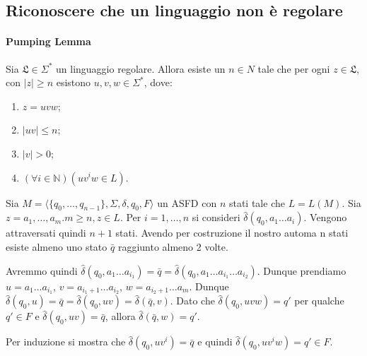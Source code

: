 \documentclass[a4paper, 10pt]{report}
\begin{document}
\subsection*{Riconoscere che un linguaggio non è regolare}

\paragraph*{Pumping Lemma} Sia $\mathfrak{L} \in \Sigma^*$ un linguaggio regolare. Allora esiste un $n\in N$ tale che per ogni $z\in \mathfrak{L}$, con $|z|\geq n$ esistono $u,v,w\in\Sigma^*$, dove:
	\begin{enumerate}
		\item $z = uvw$;
		\item $|uv|\leq n$;
		\item $|v|>0$;
		\item $(\forall i\in\mathbb{N}) (uv^iw\in L)$.
	\end{enumerate}

\begin{tcolorbox}
Sia $M=\langle\{q_0,\dotsc,q_{n-1}\},\Sigma,\delta,q_0,F\rangle$ un ASFD con $n$ stati tale che $L=L(M)$. Sia $z=a_1,\dotsc,a_m.m\geq n, z\in L$. Per $i=1,\dots,n$ si consideri $\hat\delta(q_0, a_1\dotsc a_i)$. Vengono attraversati quindi $n+1$ stati. Avendo per costruzione il nostro automa n stati esiste almeno uno stato $\bar q$ raggiunto almeno 2 volte. 
	
	Avremmo quindi $\hat\delta(q_0, a_1\dots a_{i_1}) = \bar q = \hat\delta(q_0, a_1\dots a_{i_1} \dots a_{i_2})$. Dunque prendiamo $u=a_1\dots a_{i_1}$, $v=a_{i_1+1}\dots a_{i_2}$, $w=a_{i_2+1}\dots a_m$. Dunque $\hat\delta(q_0, u) = \bar q = \hat\delta(q_0, uv) = \hat\delta(\bar q, v)$. Dato che $\hat\delta(q_0, uvw) = q'$ per qualche $q'\in F$ e $\hat\delta(q_0, uv) = \bar q$, allora $\hat\delta(\bar q, w) = q'$.
	
	Per induzione si mostra che $\hat\delta(q_0,uv^i)=\bar q$ e quindi $\hat\delta(q_0, uv^iw) = q'\in F$. 

\end{tcolorbox}
\end{document}
